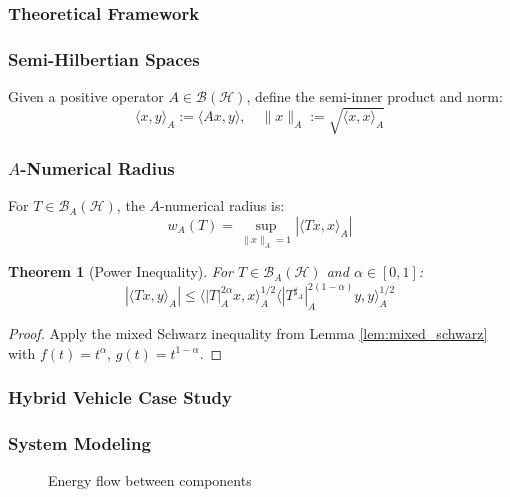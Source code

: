 \documentclass{article}
\newtheorem{theorem}{Theorem}[section]
\begin{document}
\subsubsection*{Theoretical Framework}
\subsubsection{Semi-Hilbertian Spaces}
Given a positive operator $A \in \mathcal{B}(\mathcal{H})$, define the semi-inner product and norm:
\[
\langle x, y \rangle_A := \langle Ax, y \rangle, \quad \|x\|_A := \sqrt{\langle x, x \rangle_A}
\]

\subsubsection{$A$-Numerical Radius}
For $T \in \mathcal{B}_A(\mathcal{H})$, the $A$-numerical radius is:
\[
w_A(T) = \sup_{\|x\|_A = 1} |\langle Tx, x \rangle_A|
\]
\begin{theorem}[Power Inequality]
For $T \in \mathcal{B}_A(\mathcal{H})$ and $\alpha \in [0,1]$:
\[
|\langle Tx, y \rangle_A| \leq \langle |T|_A^{2\alpha}x, x \rangle_A^{1/2} \langle |T^{\sharp_A}|_A^{2(1-\alpha)}y, y \rangle_A^{1/2}\]
\end{theorem}
\begin{proof}
Apply the mixed Schwarz inequality from Lemma \ref{lem:mixed_schwarz} with $f(t) = t^\alpha$, $g(t) = t^{1-\alpha}$.
\end{proof}
\newpage
\subsubsection*{Hybrid Vehicle Case Study}
\subsubsection{System Modeling}
\begin{figure}[h]
\centering
{}
\caption{Energy flow between components}
\end{figure}
\end{document}
